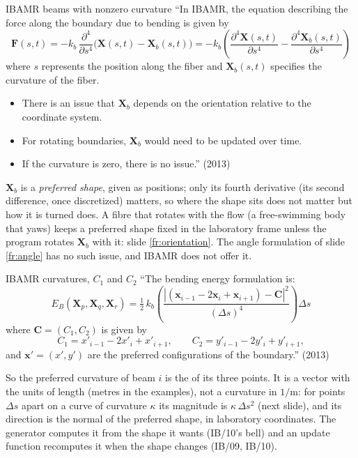 \documentclass[aspectratio=169,11pt]{beamer}
\begin{document}
\begin{frame}{IBAMR beams with nonzero curvature}
\label{fr:nonzero}
\small ``In IBAMR, the equation describing the force along the boundary due to bending is given by
\[
  \mathbf{F}(s,t) = -k_b\,\frac{\partial^4}{\partial s^4}\big(\mathbf{X}(s,t) - \mathbf{X}_b(s,t)\big) = -k_b\left(\frac{\partial^4 \mathbf{X}(s,t)}{\partial s^4} - \frac{\partial^4 \mathbf{X}_b(s,t)}{\partial s^4}\right)
\]
where $s$ represents the position along the fiber and $\mathbf{X}_b(s,t)$ specifies the curvature of the fiber.
\begin{itemize}
  \item There is an issue that $\mathbf{X}_b$ depends on the orientation relative to the coordinate system.
  \item For rotating boundaries, $\mathbf{X}_b$ would need to be updated over time.
  \item If the curvature is zero, there is no issue.'' (2013)
\end{itemize}
\vspace{1mm}
\begin{punchbox}
\small $\mathbf{X}_b$ is a \emph{preferred shape}, given as positions; only its fourth derivative (its second difference, once discretized) matters, so where the shape sits does not matter but how it is turned does. A fibre that rotates with the flow (a free-swimming body that yaws) keeps a preferred shape fixed in the laboratory frame unless the program rotates $\mathbf{X}_b$ with it: slide \ref{fr:orientation}. The angle formulation of slide \ref{fr:angle} has no such issue, and IBAMR does not offer it.
\end{punchbox}
\end{frame}

\begin{frame}{IBAMR curvatures, $C_1$ and $C_2$}
\label{fr:c1c2}
\small ``The bending energy formulation is:
\[
  E_B(\mathbf{X}_p, \mathbf{X}_q, \mathbf{X}_r) = \tfrac12\,k_b\left(\frac{\left|(\mathbf{x}_{i-1} - 2\mathbf{x}_i + \mathbf{x}_{i+1}) - \mathbf{C}\right|^2}{(\Delta s)^4}\right)\Delta s
\]
where $\mathbf{C} = (C_1, C_2)$ is given by
\[
  C_1 = x'_{i-1} - 2x'_i + x'_{i+1}, \qquad C_2 = y'_{i-1} - 2y'_i + y'_{i+1},
\]
and $\mathbf{x}' = (x', y')$ are the preferred configurations of the boundary.'' (2013)
\vspace{1mm}

\footnotesize So the preferred curvature of beam $i$ is the  of its three points. It is a vector with the units of length (metres in the examples), not a curvature in $1/\mathrm{m}$: for points $\Delta s$ apart on a curve of curvature $\kappa$ its magnitude is $\kappa\,\Delta s^2$ (next slide), and its direction is the normal of the preferred shape, in laboratory coordinates. The generator computes it from the shape it wants (IB/10's bell) and an update function recomputes it when the shape changes (IB/09, IB/10).
\end{frame}
\end{document}
